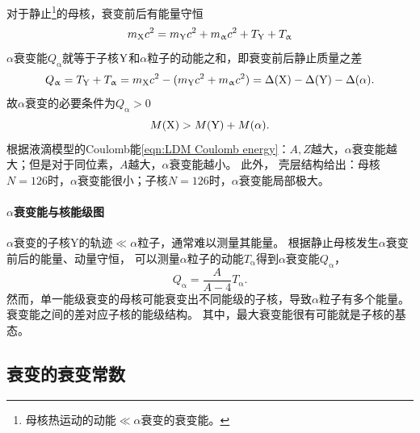 对于静止\footnote{母核热运动的动能$\ll \alpha$衰变的衰变能。}的母核，衰变前后有能量守恒
\[
	m_{\mathrm{X}}c^2 = m_{\mathrm{Y}}c^2 + m_\upalpha c^2 + T_{\mathrm{Y}} + T_\upalpha
\]
$\alpha$衰变能$Q_\upalpha$就等于子核$\mathrm{Y}$和$\alpha$粒子的动能之和，即衰变前后静止质量之差
\begin{equation}
	Q_\upalpha = T_{\mathrm{Y}} + T_\upalpha = m_{\mathrm{X}}c^2 - (m_{\mathrm{Y}}c^2 + m_\upalpha c^2) = \Delta(\mathrm{X}) - \Delta(\mathrm{Y}) - \Delta(\alpha).
\end{equation}
故$\alpha$衰变的必要条件为$Q_\upalpha > 0$
\begin{equation}\label{eq:nrd-alpha-mass-threshold}
	M(\mathrm{X}) > M(\mathrm{Y}) + M(\alpha).
\end{equation}
根据液滴模型的Coulomb能\eqref{eqn:LDM Coulomb energy}：$A,Z$越大，$\alpha$衰变能越大；但是对于同位素，$A$越大，$\alpha$衰变能越小。
此外，
壳层结构给出：母核$N = 126$时，$\alpha$衰变能很小；子核$N = 126$时，$\alpha$衰变能局部极大。

\paragraph{$\alpha$衰变能与核能级图}

$\alpha$衰变的子核Y的轨迹$\ll \alpha$粒子，通常难以测量其能量。
根据静止母核发生$\alpha$衰变前后的能量、动量守恒，
可以测量$\alpha$粒子的动能$T_\upalpha$得到$\alpha$衰变能$Q_\upalpha$，
\begin{equation}
	Q_\upalpha = \frac A{A - 4}T_\upalpha.
\end{equation}
然而，单一能级衰变的母核可能衰变出不同能级的子核，导致$\alpha$粒子有多个能量。衰变能之间的差对应子核的能级结构。
其中，最大衰变能很有可能就是子核的基态。

\begin{notecaptionblock}
	\label{fig:decay alpha}
\end{notecaptionblock}

\subsection{\alpharay 衰变的衰变常数}

